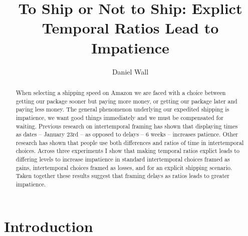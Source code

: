 \documentclass[]{article}
\title{To Ship or Not to Ship: Explict Temporal Ratios Lead to Impatience}
\author{Daniel Wall}
\begin{document}
\maketitle

\begin{abstract}
	When selecting a shipping speed on Amazon we are faced with a choice between getting our package sooner but paying more money, or getting our package later and paying less money. 
	The general phenomenon underlying our expedited shipping is impatience, we want good things immediately and we must be compensated for waiting. 
	Previous research on intertemporal framing has shown that displaying times as dates -- January 23rd -- as opposed to delays -- 6 weeks -- increases patience. 
	Other research has shown that people use both differences and ratios of time in intertemporal choices. 
	Across three experiments I show that making temporal ratios explict leads to differing levels to increase impatience in standard  intertemporal choices framed as gains, intertemporal choices framed as losses, and for an explicit shipping scenario. 
	Taken together these results suggest that framing delays as ratios leads to greater impatience.
	 
%
	
\end{abstract}

\section{Introduction}
\end{document}
